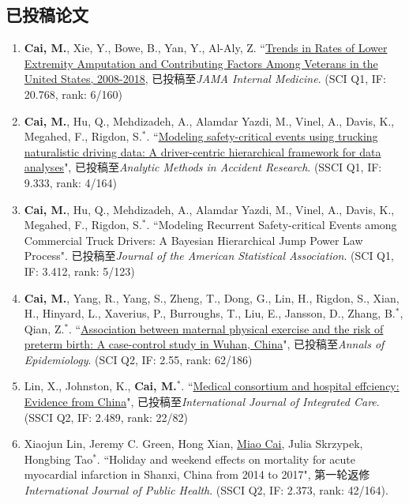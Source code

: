 \documentclass[11pt, a4paper]{article}
\begin{document}
	\subsection*{已投稿论文}
	\begin{enumerate}[leftmargin=0ex,itemsep=1ex]
		\item \textbf{Cai, M.}, Xie, Y., Bowe, B., Yan, Y., Al-Aly, Z. ``\ul{Trends in Rates of Lower Extremity Amputation and Contributing Factors Among Veterans in the United States, 2008-2018}, 已投稿至\emph{JAMA Internal Medicine}. (SCI Q1, IF: 20.768, rank: 6/160)
		
		\item \textbf{Cai, M.}, Hu, Q., Mehdizadeh, A., Alamdar Yazdi, M., Vinel, A., Davis, K., Megahed, F., Rigdon, S.$^\ast$. ``\ul{Modeling safety-critical events using trucking naturalistic driving data: A driver-centric hierarchical framework for data analyses}", 已投稿至\emph{Analytic Methods in Accident Research}. (SSCI Q1, IF: 9.333, rank: 4/164)
		
		\item \textbf{Cai, M.}, Hu, Q., Mehdizadeh, A., Alamdar Yazdi, M., Vinel, A., Davis, K., Megahed, F., Rigdon, S.$^\ast$. ``Modeling Recurrent Safety-critical Events among Commercial Truck Drivers: A Bayesian Hierarchical Jump Power Law Process". 已投稿至\emph{Journal of the American Statistical Association}. (SCI Q1, IF: 3.412, rank: 5/123)
		
		\item \textbf{Cai, M.}, Yang, R., Yang, S., Zheng, T., Dong, G., Lin, H., Rigdon, S., Xian, H., Hinyard, L., Xaverius, P., Burroughs, T., Liu, E., Jansson, D., Zhang, B.$^\ast$, Qian, Z.$^\ast$. ``\ul{Association between maternal physical exercise and the risk of preterm birth: A case-control study in Wuhan, China}", 已投稿至\emph{Annals of Epidemiology}. (SCI Q2, IF: 2.55, rank: 62/186)
		
		\item Lin, X., Johnston, K., \textbf{Cai, M.$^*$}. ``\ul{Medical consortium and hospital effciency: Evidence from China}", 已投稿至\emph{International Journal of Integrated Care}. (SSCI Q2, IF: 2.489, rank: 22/82)
		
		\item Xiaojun Lin, Jeremy C. Green, Hong Xian, \underline{Miao Cai}, Julia Skrzypek, Hongbing Tao$^\ast$. ``Holiday and weekend effects on mortality for acute myocardial infarction in Shanxi, China from 2014 to 2017", 第一轮返修\emph{International Journal of Public Health}. (SSCI Q2, IF: 2.373, rank: 42/164).
	\end{enumerate}
	
\end{document}
